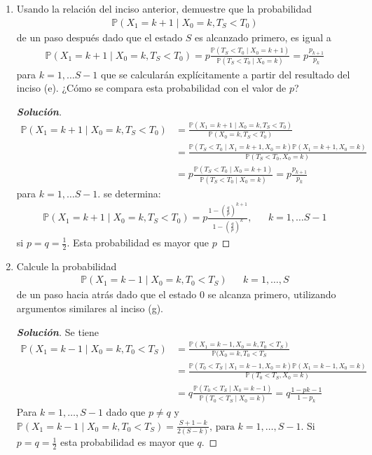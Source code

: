 \documentclass[12pt, letterpaper]{article}
\newcommand{\p}{\mathbb{P}}
\newenvironment{manualtheorem}[1]{%
  \renewcommand\themanualtheoreminner{#1}%
  \manualtheoreminner
}{\endmanualtheoreminner}
\newenvironment{solucion}
  {\renewcommand\qedsymbol{$\square$}\begin{proof}[\textbf{Solución}]}
  {\end{proof}}
\begin{document}
\begin{manualtheorem}{3.2}
\begin{enumerate}
        \item Usando la relación del inciso anterior, demuestre que la probabilidad
        \begin{align*}
            \p(X_1=k+1\mid X_0=k, T_S < T_0)
        \end{align*}
        de un paso después dado que el estado $S$ es alcanzado primero, es igual a
        \begin{align*}
            \p(X_1=k+1\mid X_0=k, T_S < T_0)=p\frac{\p(T_S < T_0\mid X_0=k+1)}{\p(T_S < T_0\mid X_0=k)}=p\frac{p_{k+1}}{p_k}
        \end{align*}
        para $k=1,\dots S-1$ que se calcularán explícitamente a partir del resultado del inciso (e). ¿Cómo se compara esta probabilidad con el valor de $p$?
        \begin{solucion}
            \begin{align*}
                \p(X_1=k+1\mid X_0=k, T_S < T_0)&=\frac{\p(X_1=k+1\mid X_0=k, T_S < T_0)}{\p(X_0=k,T_S < T_0)}\\[0.1in]
                &=\frac{\p(T_S < T_0\mid X_1=k+1,X_0=k)\p(X_1=k+1,X_0=k)}{\p(T_S < T_0, X_0=k)}\\[0.1in]
                &=p\frac{\p(T_S < T_0\mid X_0=k+1)}{\p(T_S < T_0\mid X_0=k)}=p\frac{p_{k+1}}{p_k}
            \end{align*}
            para $k=1,\dots S-1$. se determina:
            \begin{align*}
                \p(X_1=k+1\mid X_0=k, T_S < T_0)=p\frac{1-\left(\frac{q}{p}\right)^{k+1}}{1-\left(\frac{q}{p}\right)^{k}}, & & k=1,\dots S-1
            \end{align*}
            si $p=q=\frac{1}{2}$. Esta probabilidad es mayor que $p$
        \end{solucion}
        
        \item Calcule la probabilidad
        \begin{align*}
            \p(X_1=k-1 \mid X_0 = k, T_0<T_S) & & k=1,\dots,S
        \end{align*}
        de un paso hacia atrás dado que el estado 0 se alcanza primero, utilizando argumentos similares al inciso (g).
        \begin{solucion}
            Se tiene
            \begin{align*}
                \p(X_1=k-1 \mid X_0 = k, T_0<T_S)&=\frac{\p(X_1=k-1, X_0 = k, T_0<T_S)}{\p(X_0=k,T_0<T_S}\\[0.1in]
                &=\frac{\p(T_0<T_S\mid X_1=k-1,X_0=k)\p(X_1=k-1,X_0=k)}{\p(T_0<T_S, X_0=k)}\\[0.1in]
                &=q\frac{\p(T_0<T_S \mid X_0= k-1)}{\p(T_0<T_S\mid X_0= k)}=q\frac{1-p{k-1}}{1-p_k}
            \end{align*}
            Para $k=1,\dots,S-1$ dado que $p\neq q $ y $\p(X_1=k-1\mid X_0=k,T_0<T_S)=\frac{S+1-k}{2(S-k)}\textrm{, para }k=1,\dots,S-1$. Si $p=q=\frac{1}{2}$ esta probabilidad es mayor que $q$.
        \end{solucion}
        

\end{enumerate}
\end{manualtheorem}
\end{document}
